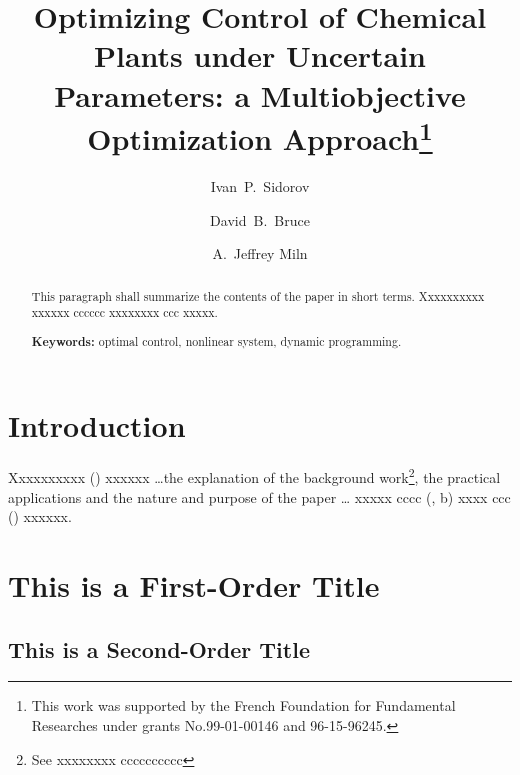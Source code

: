 \documentclass[citeauthoryear]{GTM2020}
\begin{document}
\title{Optimizing Control of Chemical Plants under Uncertain \\
Parameters: a Multiobjective Optimization Approach\thanks{This work
was supported by the
French Foundation for Fundamental Researches under grants
No.99-01-00146 and 96-15-96245.}}
\author{Ivan~P.~Sidorov \and David~B.~Bruce \and
A.~Jeffrey Miln}

\maketitle

\begin{abstract}
This paragraph shall summarize the contents of the paper
in short terms. Xxxxxxxxxx xxxxxx cccccc xxxxxxxx ccc xxxxx.
\vskip3pt

{\bf Keywords:} optimal control, nonlinear system, dynamic
programming.
\end{abstract}

\section{Introduction}

Xxxxxxxxxx (\cite{Bel}) xxxxxx \dots the explanation of the
background work\footnote{See xxxxxxxx cccccccccc},
the practical applications and the nature and purpose of the paper \dots
xxxxx cccc (\cite{tar1}, b) xxxx ccc (\cite{mash:pel}) xxxxxx.

\section{This is a First-Order Title}

\subsection{This is a Second-Order Title}
\end{document}
